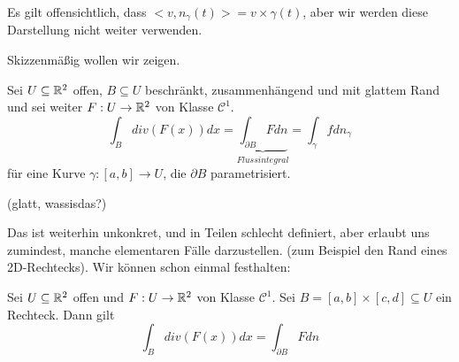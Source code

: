 \documentclass[main.tex]{subfiles}
\begin{document}
\begin{Bemerkung}
  Es gilt offensichtlich, dass $<v,n_\gamma(t)> = v \times \gamma(t)$, aber wir werden diese Darstellung nicht weiter verwenden.
\end{Bemerkung}

Skizzenmäßig wollen wir zeigen.

\begin{Theorem}
  Sei $U \subseteq \mathbb{R}^2$ offen, $B \subseteq U$ beschränkt, zusammenhängend und mit glattem Rand und sei weiter $F: U \to \mathbb{R}^2$ von Klasse $\mathcal{C}^1$.
  $$\int_B div(F(x))dx = \underbrace{\int_{\partial B} F dn}_{Flussintegral} = \int_\gamma f dn_\gamma$$
  für eine Kurve $\gamma:[a,b] \to U$, die $\partial B$ parametrisiert.

  (glatt, wassisdas?)
\end{Theorem}

Das ist weiterhin unkonkret, und in Teilen schlecht definiert, aber erlaubt uns zumindest, manche elementaren Fälle darzustellen. (zum Beispiel den Rand eines 2D-Rechtecks). Wir können schon einmal festhalten:

\begin{Theorem}
  Sei $U \subseteq \mathbb{R}^2$ offen und  $F: U \to \mathbb{R}^2$ von Klasse $\mathcal{C}^1$. Sei $B = [a,b] \times [c,d] \subseteq U$ ein Rechteck. Dann gilt
  $$\int_B div(F(x)) dx = \int_{\partial B} F dn$$
\end{Theorem}
\end{document}
